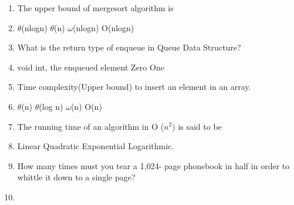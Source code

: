 \documentclass[12pt ,a4paper]{exam}
\begin{document}
	\begin{enumerate}[start=1,label={\bfseries Q\arabic*)}]
		\itemsep0.2em
		
		\item The upper bound of mergesort algorithm is
		\item[] 
		\begin{oneparchoices}
			\choice $\theta$(nlogn)  %
			\choice $\theta$(n) 
			\choice $\omega$(nlogn) 
			\choice O(nlogn) 
		\end{oneparchoices}
		
		\item What is the return type of enqueue in Queue Data Structure?
		\item[] 
		\begin{oneparchoices}
			\choice void  %
			\choice int, the enqueued element 
			\choice Zero 
			\choice One
		\end{oneparchoices}
	
		\item Time complexity(Upper bound) to insert an element in an array.
		\item[] 
		\begin{oneparchoices}
			\choice $\theta$(n)  %
	    	\choice $\theta$(log n) 
	    	\choice $\omega$(n) 
	    	\choice O(n) 
		\end{oneparchoices}
	
		\item The running time of an algorithm in O ($n^2$) is said to be
		\item[] 
		\begin{oneparchoices}
			\choice  Linear%
			\choice Quadratic
			\choice Exponential
			\choice Logarithmic.
	 	\end{oneparchoices}
 	 \item How many times must you tear a 1,024- page phonebook in half in order to whittle it down to a single page?
 	 	\item[] 
 	 \begin{oneparchoices}
 	 	\choice 10
 	 	\choice 32
 	 	\choice 512
 	 \end{oneparchoices}
    \end{enumerate}
	
\end{document}
